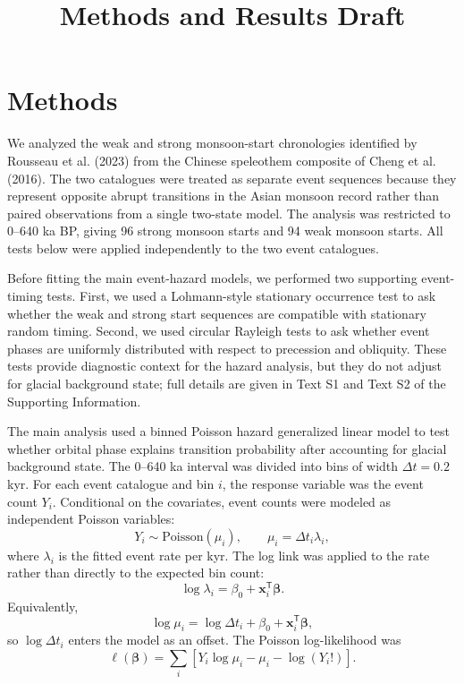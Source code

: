 \documentclass[11pt]{article}
\title{Methods and Results Draft}
\author{}
\date{}
\begin{document}
\maketitle

\section*{Methods}

We analyzed the weak and strong monsoon-start chronologies identified by Rousseau et al. (2023) from the Chinese speleothem composite of Cheng et al. (2016). The two catalogues were treated as separate event sequences because they represent opposite abrupt transitions in the Asian monsoon record rather than paired observations from a single two-state model. The analysis was restricted to 0--640 ka BP, giving 96 strong monsoon starts and 94 weak monsoon starts. All tests below were applied independently to the two event catalogues.

Before fitting the main event-hazard models, we performed two supporting event-timing tests. First, we used a Lohmann-style stationary occurrence test to ask whether the weak and strong start sequences are compatible with stationary random timing. Second, we used circular Rayleigh tests to ask whether event phases are uniformly distributed with respect to precession and obliquity. These tests provide diagnostic context for the hazard analysis, but they do not adjust for glacial background state; full details are given in Text S1 and Text S2 of the Supporting Information.

The main analysis used a binned Poisson hazard generalized linear model to test whether orbital phase explains transition probability after accounting for glacial background state. The 0--640 ka interval was divided into bins of width \(\Delta t = 0.2\) kyr. For each event catalogue and bin \(i\), the response variable was the event count \(Y_i\). Conditional on the covariates, event counts were modeled as independent Poisson variables:
\[
Y_i \sim \mathrm{Poisson}(\mu_i),
\qquad
\mu_i = \Delta t_i \lambda_i,
\]
where \(\lambda_i\) is the fitted event rate per kyr. The log link was applied to the rate rather than directly to the expected bin count:
\[
\log \lambda_i
= \beta_0 + \mathbf{x}_i^\mathsf{T}\boldsymbol{\beta}.
\]
Equivalently,
\[
\log \mu_i
= \log \Delta t_i + \beta_0 + \mathbf{x}_i^\mathsf{T}\boldsymbol{\beta},
\]
so \(\log\Delta t_i\) enters the model as an offset. The Poisson log-likelihood was
\[
\ell(\boldsymbol{\beta})
=
\sum_i
\left[
Y_i\log\mu_i - \mu_i - \log(Y_i!)
\right].
\]
\end{document}
